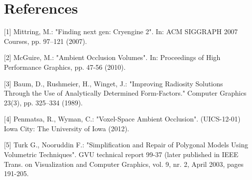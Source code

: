 \documentclass{amsart}
\begin{document}
\section*{References}

[1] Mittring, M.: "Finding next gen: Cryengine 2". In: ACM SIGGRAPH 2007 Courses, pp. 97--121 (2007).


[2] McGuire, M.: "Ambient Occlusion Volumes". In: Proceedings of High Performance Graphics, pp. 47-56 (2010).


[3] Baum, D., Rushmeier, H., Winget, J.: "Improving Radiosity Solutions Through the Use of Analytically Determined Form-Factors." Computer Graphics 23(3), pp. 325--334 (1989).


[4] Penmatsa, R., Wyman, C.: "Voxel-Space Ambient Occlusion". (UICS-12-01) Iowa City: The University of Iowa (2012).


[5] Turk G., Nooruddin F.: "Simplification and Repair of Polygonal Models Using Volumetric Techniques". GVU technical report 99-37 (later published in IEEE Trans. on Visualization and Computer Graphics, vol. 9, nr. 2, April 2003, pages 191-205.
\end{document}
